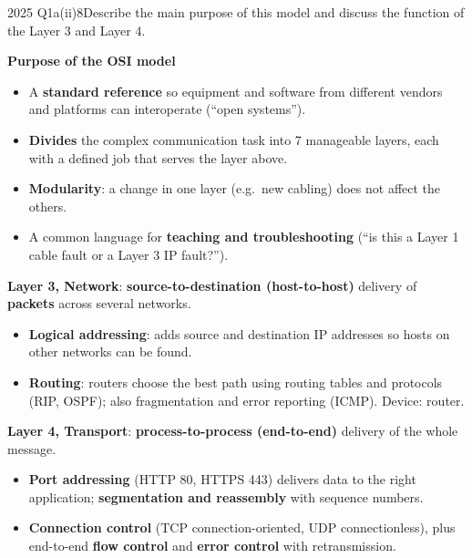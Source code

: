\documentclass[10pt]{article}
\begin{document}
\begin{pastq}{2025 Q1a(ii)}{8}Describe the main purpose of this model and discuss the function of the Layer 3 and Layer 4.\end{pastq}
\begin{ans}
\textbf{Purpose of the OSI model}
\begin{itemize}
\item A \textbf{standard reference} so equipment and software from different vendors and platforms can interoperate (``open systems'').
\item \textbf{Divides} the complex communication task into 7 manageable layers, each with a defined job that serves the layer above.
\item \textbf{Modularity}: a change in one layer (e.g.\ new cabling) does not affect the others.
\item A common language for \textbf{teaching and troubleshooting} (``is this a Layer 1 cable fault or a Layer 3 IP fault?'').
\end{itemize}
\textbf{Layer 3, Network}: \textbf{source-to-destination (host-to-host)} delivery of \textbf{packets} across several networks.
\begin{itemize}
\item \textbf{Logical addressing}: adds source and destination IP addresses so hosts on other networks can be found.
\item \textbf{Routing}: routers choose the best path using routing tables and protocols (RIP, OSPF); also fragmentation and error reporting (ICMP). Device: router.
\end{itemize}
\textbf{Layer 4, Transport}: \textbf{process-to-process (end-to-end)} delivery of the whole message.
\begin{itemize}
\item \textbf{Port addressing} (HTTP 80, HTTPS 443) delivers data to the right application; \textbf{segmentation and reassembly} with sequence numbers.
\item \textbf{Connection control} (TCP connection-oriented, UDP connectionless), plus end-to-end \textbf{flow control} and \textbf{error control} with retransmission.
\end{itemize}
\end{ans}
\end{document}
